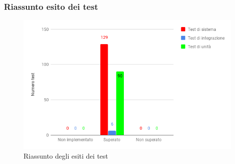 \subsubsection{Riassunto esito dei test}
\label{Riassuntotest}

	\begin{figure}[H]{\textwidth}
  		\centering
  		\includegraphics[width=1\linewidth]{./img/Test/TestRiassunto.png}
	  	\caption[Riassunto test]{Riassunto degli esiti dei test}
	\end{figure}
